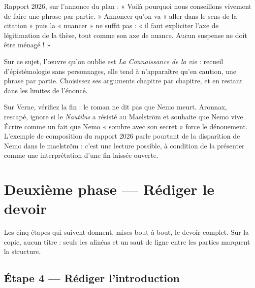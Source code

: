 \documentclass[11pt,a4paper]{article}
\begin{document}
\begin{jury}

Rapport 2026, sur l'annonce du plan : « Voilà pourquoi nous conseillons vivement de faire une phrase par partie. » Annoncer qu'on va « aller dans le sens de la citation » puis la « nuancer » ne suffit pas : « il faut expliciter l'axe de légitimation de la thèse, tout comme son axe de nuance. Aucun suspense ne doit être ménagé ! »

\end{jury}

\begin{piege}

Sur ce sujet, l'œuvre qu'on oublie est \emph{La Connaissance de la vie} : recueil d'épistémologie sans personnages, elle tend à n'apparaître qu'en caution, une phrase par partie. Choisissez ses arguments chapitre par chapitre, et en restant dans les limites de l'énoncé.

\end{piege}

\begin{piege}

Sur Verne, vérifiez la fin : le roman ne dit pas que Nemo meurt. Aronnax, rescapé, ignore si le \emph{Nautilus} a résisté au Maelström et souhaite que Nemo vive. Écrire comme un fait que Nemo « sombre avec son secret » force le dénouement. L'exemple de composition du rapport 2026 parle pourtant de la disparition de Nemo dans le maelström : c'est une lecture possible, à condition de la présenter comme une interprétation d'une fin laissée ouverte.

\end{piege}

\hypertarget{deuxiuxe8me-phase-ruxe9diger-le-devoir}{%
\section{Deuxième phase --- Rédiger le devoir}\label{deuxiuxe8me-phase-ruxe9diger-le-devoir}}

Les cinq étapes qui suivent donnent, mises bout à bout, le devoir complet. Sur la copie, aucun titre : seuls les alinéas et un saut de ligne entre les parties marquent la structure.

\hypertarget{uxe9tape-4-ruxe9diger-lintroduction}{%
\subsection{Étape 4 --- Rédiger l'introduction}\label{uxe9tape-4-ruxe9diger-lintroduction}}
\end{document}
